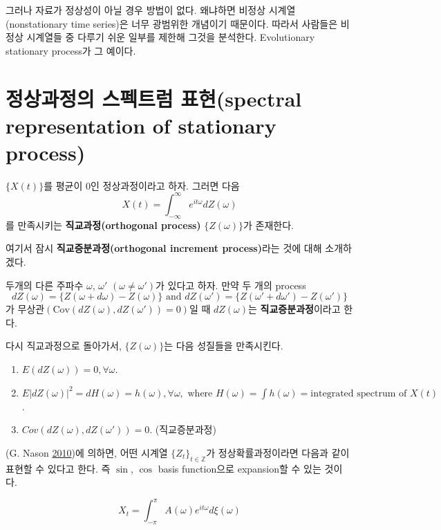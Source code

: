 \documentclass[b5paper,]{book}
\theoremstyle{definition}
\theoremstyle{definition}
\theoremstyle{definition}
\theoremstyle{remark}
\let\BeginKnitrBlock\begin \let\EndKnitrBlock\end
\begin{document}
그러나 자료가 정상성이 아닐 경우 방법이 없다. 왜냐하면 비정상
시계열(nonstationary time series)은 너무 광범위한 개념이기 때문이다.
따라서 사람들은 비정상 시계열들 중 다루기 쉬운 일부를 제한해 그것을
분석한다. Evolutionary stationary process가 그 예이다.

\section{정상과정의 스펙트럼 표현(spectral representation of stationary
process)}\label{--spectral-representation-of-stationary-process}

\(\{ X(t) \}\)를 평균이 0인 정상과정이라고 하자. 그러면 다음
\[X(t)=\int_{-\infty}^{\infty} e^{it\omega}dZ(\omega)\] 를 만족시키는
\textbf{직교과정(orthogonal process)} \(\{Z(\omega)\}\)가 존재한다.

여기서 잠시 \textbf{직교증분과정(orthogonal increment process)}라는 것에
대해 소개하겠다.

\BeginKnitrBlock{definition}[직교증분과정]
\protect\hypertarget{def:unnamed-chunk-143}{}{\label{def:unnamed-chunk-143}
{} }두개의 다른 주파수 \(\omega\),
\(\omega'\) \((\omega \neq \omega')\)가 있다고 하자. 만약 두 개의
process
\[dZ(\omega)=\{Z(\omega +d\omega)-Z(\omega)\} \text{ and } dZ(\omega')=\{Z(\omega' +d\omega')-Z(\omega')\}\]
가 무상관\((\text{Cov}(dZ(\omega), dZ(\omega'))=0)\)일 때
\(dZ(\omega)\)는 \textbf{직교증분과정}이라고 한다.
\EndKnitrBlock{definition}

다시 직교과정으로 돌아가서, \(\{Z(\omega)\}\)는 다음 성질들을
만족시킨다.

\begin{enumerate}
\def\labelenumi{\arabic{enumi}.}
\item
  \(E(dZ(\omega))=0, \forall \omega\).
\item
  \(E|dZ(\omega)|^{2}=d H(\omega)=h(\omega), \forall \omega, \text{ where } H(\omega)=\int h(\omega)=\text{integrated spectrum of } X(t)\).
\item
  \(Cov(dZ(\omega), dZ(\omega'))=0\). (직교증분과정)
\end{enumerate}

(G. Nason \protect\hyperlink{ref-Nason2010}{2010})에 의하면, 어떤 시계열
\(\{Z_{t} \}_{t\in \mathbb{Z}}\)가 정상확률과정이라면 다음과 같이 표현할
수 있다고 한다. 즉 \(\sin\), \(\cos\) basis function으로 expansion할 수
있는 것이다.

\begin{equation}
X_{t}=\int_{-\pi}^{\pi}A(\omega)e^{it\omega}d\xi(\omega)
\end{equation}
\end{document}
